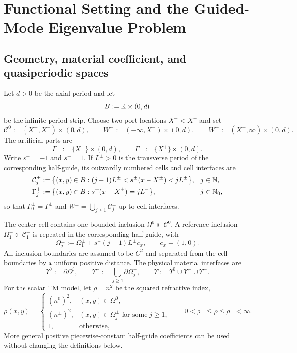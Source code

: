 \section{Functional Setting and the Guided-Mode Eigenvalue Problem}
\label{sec:functional-setting}

\subsection{Geometry, material coefficient, and quasiperiodic spaces}

Let $d>0$ be the axial period and let
\[
  B:=\mathbb{R}\times(0,d)
\]
be the infinite period strip.  Choose two port locations $X^-<X^+$ and set
\[
  \mathcal C^0:=(X^-,X^+)\times(0,d),\qquad
  W^-:=(-\infty,X^-)\times(0,d),\qquad
  W^+:=(X^+,\infty)\times(0,d).
\]
The artificial ports are
\[
  \Gamma^-:=\{X^-\}\times(0,d),\qquad
  \Gamma^+:=\{X^+\}\times(0,d).
\]
Write $s^-= -1$ and $s^+=1$.  If $L^\pm>0$ is the transverse period of the
corresponding half-guide, its outwardly numbered cells and cell interfaces are
\begin{align*}
  \mathcal C_j^\pm
  &:=\bigl\{(x,y)\in B:(j-1)L^\pm<s^\pm(x-X^\pm)<jL^\pm\bigr\},
  &&j\in\mathbb{N},\\
  \Gamma_j^\pm
  &:=\bigl\{(x,y)\in B:s^\pm(x-X^\pm)=jL^\pm\bigr\},
  &&j\in\mathbb{N}_0,
\end{align*}
so that $\Gamma_0^\pm=\Gamma^\pm$ and
$W^\pm=\bigcup_{j\geq1}\overline{\mathcal C_j^\pm}$ up to cell interfaces.

The center cell contains one bounded inclusion
$\Omega^0\Subset\mathcal C^0$.  A reference inclusion
$\Omega_1^\pm\Subset\mathcal C_1^\pm$ is repeated in the corresponding half-guide,
with
\[
  \Omega_j^\pm:=\Omega_1^\pm+s^\pm(j-1)L^\pm e_x,
  \qquad e_x=(1,0).
\]
All inclusion boundaries are assumed to be $C^{2}$ and separated from the cell
boundaries by a uniform positive distance.  The physical material interfaces
are
\[
  \Upsilon^0:=\partial\Omega^0,\qquad
  \Upsilon^\pm:=\bigcup_{j\geq1}\partial\Omega_j^\pm,\qquad
  \Upsilon:=\Upsilon^0\cup\Upsilon^-\cup\Upsilon^+.
\]
For the scalar TM model, let $\rho=n^2$ be the squared refractive index,
\begin{equation}
  \rho(x,y)=
  \begin{cases}
    (n^0)^2,&(x,y)\in\Omega^0,\\
    (n^\pm)^2,&(x,y)\in\Omega_j^\pm\text{ for some }j\geq1,\\
    1,&\text{otherwise},
  \end{cases}
  \qquad 0<\rho_-\leq \rho\leq \rho_+<\infty.
  \label{eq:material}
\end{equation}
More general positive piecewise-constant half-guide coefficients can be used without
changing the definitions below.

